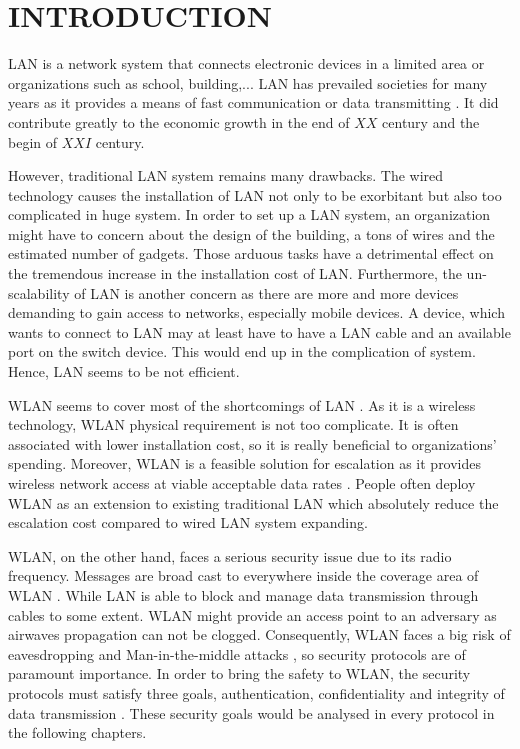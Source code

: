 \section{INTRODUCTION}

\ac{LAN} \cite{stallings1984local} is a network system that connects electronic devices in a limited area or organizations such as school, building,...  LAN has prevailed societies for many years as it provides a means of fast communication or data transmitting \cite{schultheis1988designing}. It did contribute greatly to the economic growth in the end of $XX$ century and the begin of $XXI$ century.

However, traditional \ac{LAN} system remains many drawbacks. The wired technology causes the installation of \ac{LAN} not only to be exorbitant but also too complicated in huge system. In order to set up a \ac{LAN} system, an organization might have to concern about the design of the building, a tons of wires and the estimated number of gadgets. Those arduous tasks have  a detrimental effect on the tremendous increase in the installation cost of \ac{LAN}. Furthermore, the un-scalability of \ac{LAN} is another concern as there are more and more devices demanding to gain access to networks, especially mobile devices. A device, which wants to connect to \ac{LAN} may at least have to have a \ac{LAN} cable and an available port on the switch device. This would end up in the complication of system. Hence, \ac{LAN} seems to be not efficient.

\ac{WLAN} seems to cover most of the shortcomings of \ac{LAN} \cite{al2006ieee}.  As it is a wireless technology, \ac{WLAN} physical requirement is not too complicate. It is often associated with lower installation cost, so it is really beneficial to organizations' spending. Moreover, \ac{WLAN} is a feasible solution for escalation as it provides wireless network access at viable acceptable data rates \cite{al2006ieee}. People often deploy \ac{WLAN} as an extension to existing traditional \ac{LAN} which absolutely reduce the escalation cost compared to wired \ac{LAN} system expanding.

\ac{WLAN}, on the other hand, faces a serious security issue due to its radio frequency. Messages are broad cast to everywhere inside the coverage area of \ac{WLAN} \cite{ieee1999802, shin2006wireless}. While \ac{LAN} is able to block and manage data transmission through cables to some extent. \ac{WLAN} might provide an access point to an adversary as airwaves propagation can not be clogged. Consequently, \ac{WLAN} faces a big risk of eavesdropping and Man-in-the-middle attacks \cite{shunman2003wlan}, so security protocols are of paramount importance. In order to bring the safety to \ac{WLAN}, the security protocols must satisfy three goals, authentication, confidentiality and integrity of data transmission \cite{gast2005802}. These security goals would be analysed in every protocol in the following chapters. 

